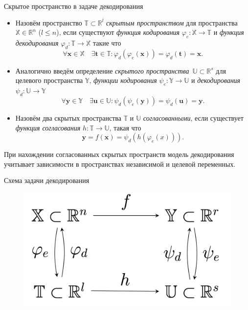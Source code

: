 \documentclass[9pt]{beamer}
\renewcommand{\phi}{\ensuremath{\varphi}}
\renewcommand{\leq}{\ensuremath{\leqslant}}
\newcommand{\bt}{\mathbf{t}}
\newcommand{\bu}{\mathbf{u}}
\newcommand{\bx}{\mathbf{x}}
\newcommand{\by}{\mathbf{y}}
\newcommand{\bbR}{\mathbb{R}}
\newcommand{\bbX}{\mathbb{X}}
\newcommand{\bbY}{\mathbb{Y}}
\newcommand{\bbT}{\mathbb{T}}
\newcommand{\bbU}{\mathbb{U}}
\begin{document}
\begin{frame}{Скрытое пространство в задаче декодирования}
		
		\begin{itemize} 
			\item
			Назовём пространство $\bbT \subset \bbR^l$ \textit{скрытым пространством} для пространства $\bbX \in \bbR^n$ ($l \leq n$), если существуют \textit{функция кодирования} $\varphi_e: \bbX \to \bbT$ и \textit{функция декодирования} $\varphi_d: \bbT  \to \bbX$ такие что
			\[
			\forall \bx \in \bbX \quad \exists \bt \in \bbT: \varphi_d (\varphi_e(\bx)) = \varphi_d(\bt) = \bx.
			\]
			\item
			Аналогично введём определение \textit{скрытого пространства}~$\bbU \subset \bbR^s$ для целевого пространства $\bbY$, \textit{функции кодирования} $\psi_e: \bbY \to \bbU$ и \textit{декодирования} $\psi_d: \bbU  \to \bbY$
			\[
			\forall \by \in \bbY \quad  \exists \bu \in \bbU: \psi_d (\psi_e(\by)) = \psi_d(\bu) = \by.
			\]
			\item 
			Назовём два скрытых пространства $\bbT$ и $\bbU$ \textit{согласованными}, если существует \textit{функция согласования} $h: \bbT \rightarrow \bbU$, такая что
			\[
				\by = f(\bx) = \psi_d(h(\phi_e(x))).
			 \]
		\end{itemize}
	При нахождении согласованных скрытых пространств модель декодирования учитывает зависимости в пространствах независимой и целевой переменных.
	
\end{frame}
\begin{frame}{Схема задачи декодирования}
	\begin{figure}
		\includegraphics[width=0.5\linewidth]{figs/decoding_scheme}
	\end{figure}
\end{frame}
\end{document}
